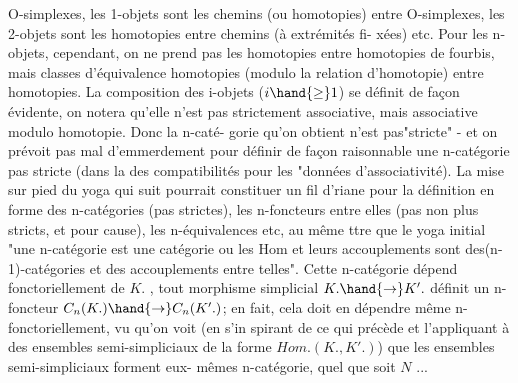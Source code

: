 
O-simplexes, les 1-objets sont les chemins  (ou homotopies) entre
O-simplexes, les 2-objets sont les homotopies entre chemins (à extrémités fi-%
xées) etc. Pour les n-objets, cependant, on ne prend pas les homotopies
entre homotopies de fourbis, mais classes d'équivalence homotopies
(modulo la relation d'homotopie) entre homotopies. La composition des
i-objets ($i\hand{\geq}1$) se définit de façon évidente, on notera qu'elle n'est pas
strictement associative, mais associative modulo homotopie. Donc la n-caté-%
gorie qu'on obtient n'est pas"stricte" - et on prévoit pas mal d'emmerdement
pour définir de façon raisonnable une n-catégorie pas stricte (dans la
\hand{/}des compatibilités  pour les "données d'associativité). La
mise sur pied du yoga qui suit pourrait constituer un fil d'riane pour la
définition en forme des n-catégories (pas strictes), les n-foncteurs entre
elles (pas non plus stricts, et pour cause), les n-équivalences etc, au
même ttre que le yoga initial "une n-catégorie est une catégorie ou les
Hom et leurs accouplements  sont des(n-1)-catégories et des accouplements
entre telles". Cette n-catégorie  dépend fonctoriellement de $K.$ , tout
morphisme simplicial $K. \hand{\to} K'.$ définit un n-foncteur $C_n(K.)\hand{\to}C_n(K'.)$; en
fait, cela doit en dépendre même n-fonctoriellement, vu qu'on voit (en s'in%
spirant de ce qui précède et l'appliquant à des ensembles semi-simpliciaux
de la forme $Hom.(K.,K'.)$) que les ensembles semi-simpliciaux forment eux-%
mêmes  n-catégorie, quel que soit $N$ ...

